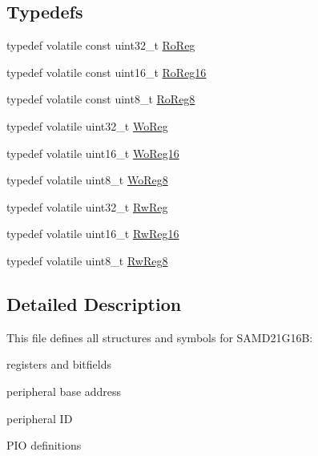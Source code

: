 \subsection*{Typedefs}
\begin{DoxyCompactItemize}
\item 
typedef volatile const uint32\+\_\+t \mbox{\hyperlink{group___s_a_m_d21_g16_b__definitions_ga5d556f8391af4141be23f7334ac9dd68}{Ro\+Reg}}
\item 
typedef volatile const uint16\+\_\+t \mbox{\hyperlink{group___s_a_m_d21_g16_b__definitions_gaebf6e33c2d49a802e06e22a95ea9d0d0}{Ro\+Reg16}}
\item 
typedef volatile const uint8\+\_\+t \mbox{\hyperlink{group___s_a_m_d21_g16_b__definitions_ga0d957f1433aaf5d70e4dc2b68288442d}{Ro\+Reg8}}
\item 
typedef volatile uint32\+\_\+t \mbox{\hyperlink{group___s_a_m_d21_g16_b__definitions_gac0f96d4e8018367b38f527007cf0eafd}{Wo\+Reg}}
\item 
typedef volatile uint16\+\_\+t \mbox{\hyperlink{group___s_a_m_d21_g16_b__definitions_ga0ab0e5f6c8301aa1c2068e511d854094}{Wo\+Reg16}}
\item 
typedef volatile uint8\+\_\+t \mbox{\hyperlink{group___s_a_m_d21_g16_b__definitions_ga5e336e5a36ee12ebeafb021108e5275b}{Wo\+Reg8}}
\item 
typedef volatile uint32\+\_\+t \mbox{\hyperlink{group___s_a_m_d21_g16_b__definitions_gacf1496e3bbe303e55f627fc7558a68c7}{Rw\+Reg}}
\item 
typedef volatile uint16\+\_\+t \mbox{\hyperlink{group___s_a_m_d21_g16_b__definitions_gacce07556c80fc352ae607f225f19fed5}{Rw\+Reg16}}
\item 
typedef volatile uint8\+\_\+t \mbox{\hyperlink{group___s_a_m_d21_g16_b__definitions_gae361754be775bb192f85821d3ab33c17}{Rw\+Reg8}}
\end{DoxyCompactItemize}


\subsection{Detailed Description}
This file defines all structures and symbols for S\+A\+M\+D21\+G16B\+:
\begin{DoxyItemize}
\item registers and bitfields
\item peripheral base address
\item peripheral ID
\item P\+IO definitions 
\end{DoxyItemize}

